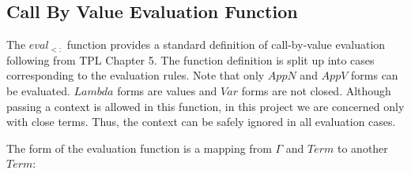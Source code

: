 \documentclass[10pt]{article}
\newcommand{\Conid}[1]{\mathit{#1}}
\newcommand{\Varid}[1]{\mathit{#1}}
\begin{document}
\subsection{Call By Value Evaluation Function}

The \ensuremath{\Varid{eval}_{<:}} function provides a standard definition of
call-by-value evaluation following from TPL Chapter 5.  The function
definition is split up into cases corresponding to the evaluation
rules.  Note that only \ensuremath{\Conid{AppN}} and \ensuremath{\Conid{AppV}} forms can be
evaluated.  \ensuremath{\Conid{Lambda}} forms are values and \ensuremath{\Conid{Var}} forms
are not closed.  Although passing a context is allowed in this
function, in this project we are concerned only with close terms.
Thus, the context can be safely ignored in all evaluation cases.

The form of the evaluation function is a mapping from \ensuremath{\Varid{\Gamma}} and
\ensuremath{\Conid{Term}} to another \ensuremath{\Conid{Term}}:
\end{document}
